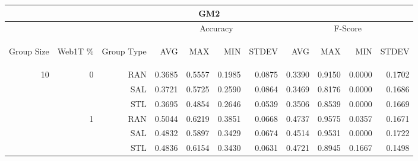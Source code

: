 \begin{center}
\begin{table}[htbp] 
 \begin{center}
\begin{tabular}{ | r | r | r | r | r | r | r | r | r | r | r |}
\hline
\multicolumn{11}{|c|}{GM2}\\
\hline
 & & & \multicolumn{4}{|c|}{Accuracy} & \multicolumn{4}{|c|}{F-Score}\\ \cline{4-11}
\begin{sideways}Group Size\end{sideways} & \begin{sideways}Web1T \%\end{sideways} & \begin{sideways}Group Type\end{sideways} & \begin{sideways}AVG\end{sideways} & \begin{sideways}MAX\end{sideways} & \begin{sideways}MIN\end{sideways} & \begin{sideways}STDEV\end{sideways} & \begin{sideways}AVG\end{sideways} & \begin{sideways}MAX\end{sideways} & \begin{sideways}MIN\end{sideways} & \begin{sideways}STDEV\end{sideways}\\
\hline
\multirow{18}{*}{10}
 & \multirow{3}{*}{0} & RAN & 0.3685 & 0.5557 & 0.1985 & 0.0875 & 0.3390 & 0.9150 & 0.0000 & 0.1702\\ \cline{3-11}
 &   & SAL & 0.3721 & 0.5725 & 0.2590 & 0.0864 & 0.3469 & 0.8176 & 0.0000 & 0.1686\\ \cline{3-11}
 &   & STL & 0.3695 & 0.4854 & 0.2646 & 0.0539 & 0.3506 & 0.8539 & 0.0000 & 0.1669\\ \cline{2-11}
 & \multirow{3}{*}{1} & RAN & 0.5044 & 0.6219 & 0.3851 & 0.0668 & 0.4737 & 0.9575 & 0.0357 & 0.1671\\ \cline{3-11}
 &   & SAL & 0.4832 & 0.5897 & 0.3429 & 0.0674 & 0.4514 & 0.9531 & 0.0000 & 0.1722\\ \cline{3-11}
 &   & STL & 0.4836 & 0.6154 & 0.3430 & 0.0631 & 0.4721 & 0.8945 & 0.1667 & 0.1498\\ \cline{2-11}

\end{tabular}
\end{center}
\end{table}
\end{center}
